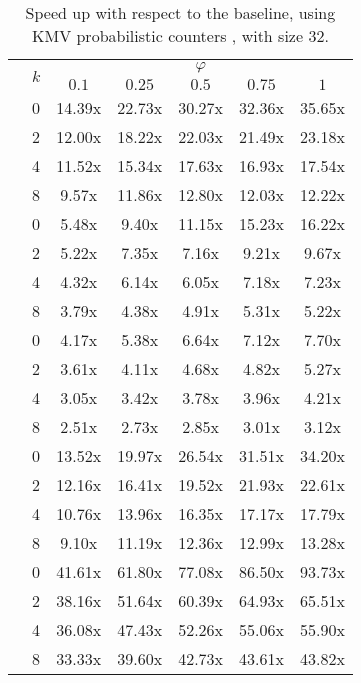 \begin{table}[ht]
    \centering
    \caption{Speed up with respect to the baseline, using KMV probabilistic counters \cite{trevisan/646978.711822}, with size $32$.}
    \begin{tabular}{ll|ccccc}
    \toprule
        & \multirow{2}{*}{$k$} & \multicolumn{5}{c}{$\varphi$} \\
        & & $0.1$ & $0.25$ & $0.5$ & $0.75$ & $1$\\
    \midrule

    \parbox[t]{2mm}{}
    & 0 & 14.39x & 22.73x & 30.27x & 32.36x & 35.65x \\
    & 2 & 12.00x & 18.22x & 22.03x & 21.49x & 23.18x \\
    & 4 & 11.52x & 15.34x & 17.63x & 16.93x & 17.54x \\
    & 8 & 9.57x & 11.86x & 12.80x & 12.03x & 12.22x \\
    \midrule[.66pt]
    
    \parbox[t]{2mm}{}
    & 0 & 5.48x & 9.40x & 11.15x & 15.23x & 16.22x \\
    & 2 & 5.22x & 7.35x & 7.16x & 9.21x & 9.67x \\
    & 4 & 4.32x & 6.14x & 6.05x & 7.18x & 7.23x \\
    & 8 & 3.79x & 4.38x & 4.91x & 5.31x & 5.22x \\
    \midrule[.66pt]
    
    \parbox[t]{2mm}{}
    & 0 & 4.17x & 5.38x & 6.64x & 7.12x & 7.70x \\
    & 2 & 3.61x & 4.11x & 4.68x & 4.82x & 5.27x \\
    & 4 & 3.05x & 3.42x & 3.78x & 3.96x & 4.21x \\
    & 8 & 2.51x & 2.73x & 2.85x & 3.01x & 3.12x \\
    \midrule[.66pt]
    
    \parbox[t]{2mm}{}
    & 0 & 13.52x & 19.97x & 26.54x & 31.51x & 34.20x \\
    & 2 & 12.16x & 16.41x & 19.52x & 21.93x & 22.61x \\
    & 4 & 10.76x & 13.96x & 16.35x & 17.17x & 17.79x \\
    & 8 & 9.10x & 11.19x & 12.36x & 12.99x & 13.28x \\
    \midrule[.66pt]
        
    \parbox[t]{2mm}{}
    & 0 & 41.61x & 61.80x & 77.08x & 86.50x & 93.73x \\
    & 2 & 38.16x & 51.64x & 60.39x & 64.93x & 65.51x \\
    & 4 & 36.08x & 47.43x & 52.26x & 55.06x & 55.90x \\
    & 8 & 33.33x & 39.60x & 42.73x & 43.61x & 43.82x \\

    \bottomrule

    \end{tabular}
    \label{tab:size-time}
\end{table}


